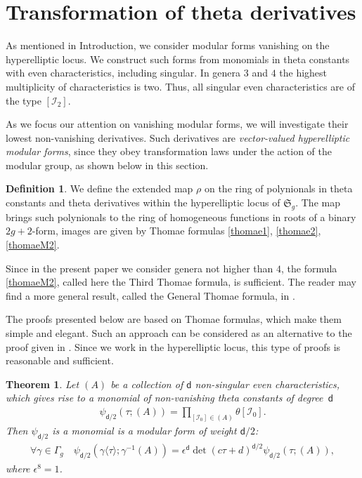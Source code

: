 \documentclass[twoside]{amsart}
\newcommand{\I}{\mathcal{I}}
\newcommand{\dd}{\textsf{d}}
\newtheorem{theo}{Theorem}[section]
\theoremstyle{definition}
\newtheorem{Def}{Definition}
\theoremstyle{plain}
\begin{document}
\section{Transformation of theta derivatives}\label{s:ThetaTransf}
As mentioned in Introduction, we consider modular forms vanishing on the hyperelliptic locus.
We construct such forms from monomials in theta constants with even characteristics, 
including singular. In genera $3$ and $4$ the highest multiplicity of characteristics is two.
Thus, all singular even characteristics are of the type $[\I_2]$.

As we focus our attention on vanishing modular forms, we will investigate their lowest 
non-vanishing derivatives. Such derivatives are \emph{vector-valued hyperelliptic modular forms},
since they obey transformation laws under the action of
the modular group, as shown below in this section.
 

\begin{Def}
We define the extended map $\rho$ on the ring of polynionals in theta constants and
theta derivatives within the hyperelliptic locus of $\mathfrak{S}_g$. 
The map brings such polynionals to the ring of homogeneous functions in roots of a binary $2g+2$-form,
images are given by Thomae formulas \eqref{thomae1}, \eqref{thomae2}, \eqref{thomaeM2}.
\end{Def}
Since in the present paper we consider genera not higher than $4$, 
the formula \eqref{thomaeM2}, called here the Third Thomae formula, is sufficient.
The reader may find a more general result, called the General Thomae formula, in \cite{bGTF}.


The proofs presented below
are based on Thomae formulas, which make them simple and elegant. Such an  approach 
can be considered as an alternative to the proof given in \cite{Ig1964}.
Since we work in the hyperelliptic locus, this type of proofs is reasonable and sufficient.

\begin{theo}\label{CMFGSI0}
Let $(A)$ be a collection of $\dd$ non-singular even characteristics, which 
gives rise to a monomial of non-vanishing theta constants of degree~$\dd$
\begin{gather}\label{GSTheta}
\psi_{\dd/2}(\tau; (A)) =  \prod_{[\I_0] \in (A)} \theta[\I_0].
\end{gather}
Then $\psi_{\dd/2}$ is a monomial is a modular form of weight $\dd/2$: 
\begin{gather}\label{I0PsiModTrans}
\forall \gamma \in \Gamma_g \quad \psi_{\dd/2}(\gamma \langle \tau \rangle; \gamma^{-1}(A)) = 
\epsilon^{\dd} \det (c \tau+d)^{\dd/2} \psi_{\dd/2}(\tau;  (A)),
\end{gather}
where $\epsilon^8 = 1$.
\end{theo}
\end{document}
